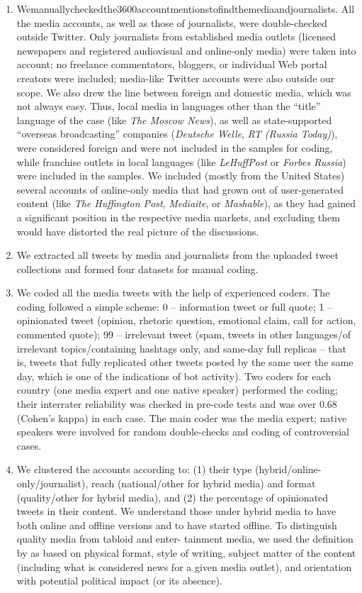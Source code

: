 \begin{enumerate}
	\item Wemanuallycheckedthe3600accountmentionstofindthemediaandjournalists. All the media accounts, as well as those of journalists, were double-checked outside Twitter. Only journalists from established media outlets (licensed newspapers and registered audiovisual and online-only media) were taken into account; no freelance commentators, bloggers, or individual Web portal creators were included; media-like Twitter accounts were also outside our scope. We also drew the line between foreign and domestic media, which was not always easy. Thus, local media in languages other than the “title” language of the case (like \textit{The Moscow News}), as well as state-supported “overseas broadcasting” companies (\textit{Deutsche Welle}, \textit{RT (Russia Today)}), were considered foreign and were not included in the samples for coding, while franchise outlets in local languages (like \textit{LeHuffPost} or \textit{Forbes Russia}) were included in the samples. We included (mostly from the United States) several accounts of online-only media that had grown out of user-generated content (like \textit{The Huffington Post}, \textit{Mediaite}, or \textit{Mashable}), as they had gained a significant position in the respective media markets, and excluding them would have distorted the real picture of the discussions.
	
	\item We extracted all tweets by media and journalists from the uploaded tweet collections and formed four datasets for manual coding.
	
	\item We coded all the media tweets with the help of experienced coders. The coding followed a simple scheme: 0 -- information tweet or full quote; 1 -- opinionated tweet (opinion, rhetoric question, emotional claim, call for action, commented quote); 99 -- irrelevant tweet (spam, tweets in other languages/of irrelevant topics/containing hashtags only, and same-day full replicas -- that is, tweets that fully replicated other tweets posted by the same user the same day, which is one of the indications of bot activity). Two coders for each country (one media expert and one native speaker) performed the coding; their interrater reliability was checked in pre-code tests and was over 0.68 (Cohen’s kappa) in each case. The main coder was the media expert; native speakers were involved for random double-checks and coding of controversial cases.
	
	\item We clustered the accounts according to: (1) their type (hybrid/online-only/journalist),
	reach (national/other for hybrid media) and format (quality/other for hybrid media), and (2) the percentage of opinionated tweets in their content. We understand those under hybrid media to have both online and offline versions \cite{Chadwick} and to have started offline. To distinguish quality media from tabloid and enter- tainment media, we used the definition by \cite[p.~71]{Norris} as based on physical format, style of writing, subject matter of the content (including what is considered news for a given media outlet), and orientation with potential political impact (or its absence).
	

\end{enumerate}

